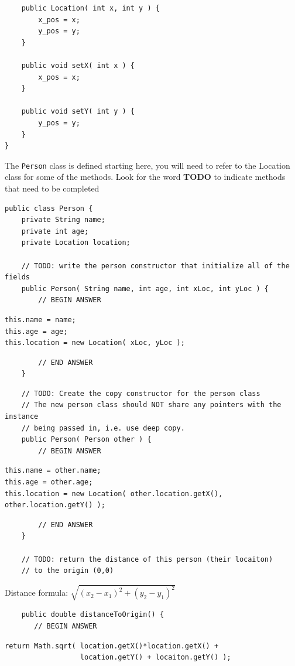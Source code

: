 \documentclass[11pt,answers]{exam}
\begin{document}
\begin{questions}
\begin{lstlisting}
	public Location( int x, int y ) {
		x_pos = x;
		y_pos = y;
	}
	
	public void setX( int x ) {
		x_pos = x;
	}
	
	public void setY( int y ) {
		y_pos = y;
	}
}	
\end{lstlisting}

The {\tt Person} class is defined starting here, you will need to refer to the Location class for some of the methods.   Look for the word {\bf TODO} to indicate methods that need to be completed
 
\begin{verbatim}
public class Person {
    private String name;
    private int age; 
    private Location location;

    // TODO: write the person constructor that initialize all of the fields
    public Person( String name, int age, int xLoc, int yLoc ) {
        // BEGIN ANSWER
\end{verbatim}
\begin{solution}[2in]
\begin{lstlisting}
this.name = name;
this.age = age;
this.location = new Location( xLoc, yLoc );
\end{lstlisting}
\end{solution}
\begin{verbatim}
        // END ANSWER
    }
\end{verbatim}
\newpage

\begin{verbatim}
	// TODO: Create the copy constructor for the person class
	// The new person class should NOT share any pointers with the instance
	// being passed in, i.e. use deep copy.
    public Person( Person other ) {
        // BEGIN ANSWER
\end{verbatim}
\begin{solution}[2in]	
\begin{lstlisting}
this.name = other.name;
this.age = other.age;
this.location = new Location( other.location.getX(), other.location.getY() );	
\end{lstlisting}
\end{solution}

\begin{verbatim}
        // END ANSWER
    }

    // TODO: return the distance of this person (their locaiton)
    // to the origin (0,0)
\end{verbatim}
\hspace{.4in}Distance formula: $\sqrt{ (x_2 - x_1)^2 + (y_2 - y_1)^2 }$
\begin{verbatim}
    public double distanceToOrigin() {
       // BEGIN ANSWER
\end{verbatim}
\begin{solution}[3in]
\begin{lstlisting}
return Math.sqrt( location.getX()*location.getX() +
                  location.getY() + locaiton.getY() );	
\end{lstlisting}
\end{solution}


\end{questions}
\end{document}
